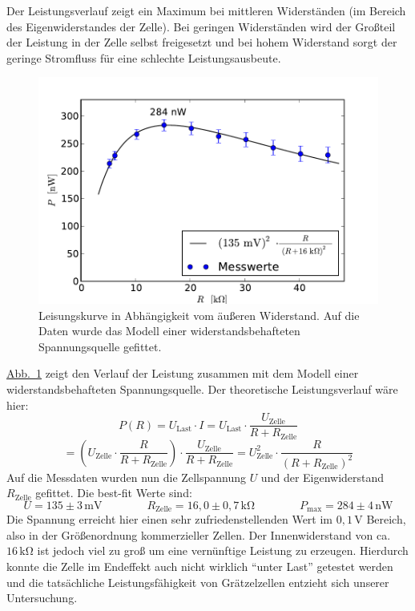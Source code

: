 \documentclass[11pt]{scrartcl}
\newcommand{\unit}[1]{\ensuremath{\,\mathrm{#1}}} %
\begin{document}
Der Leistungsverlauf zeigt ein Maximum bei mittleren Widerständen (im Bereich des Eigenwiderstandes der Zelle). Bei geringen Widerständen wird der Großteil der Leistung in der Zelle selbst freigesetzt und bei hohem Widerstand sorgt der geringe Stromfluss für eine schlechte Leistungsausbeute.
\begin{figure}[ht]
\begin{center}
\includegraphics[width=1.0\textwidth]{images/graetzel_leistung.pdf}
\end{center}
\vspace{-1.5\baselineskip}
\caption{Leisungskurve in Abhängigkeit vom äußeren Widerstand. Auf die Daten wurde das Modell einer widerstandsbehafteten Spannungsquelle gefittet.}
\label{leistungskurve}
\end{figure}
\hyperref[leistungskurve]{Abb.~\ref{leistungskurve}} zeigt den Verlauf der Leistung zusammen mit dem Modell einer widerstandsbehafteten Spannungsquelle. Der theoretische Leistungsverlauf wäre hier:
\[
P(R)= U_{\text{Last}}\cdot I
= U_{\text{Last}}\cdot \frac{U_{\text{Zelle}}}{R+R_{\text{Zelle}}}
\]
\[
= \left(U_{\text{Zelle}}\cdot \frac{R}{R+R_{\text{Zelle}}}\right)\cdot \frac{U_{\text{Zelle}}}{R+R_{\text{Zelle}}}
= U_{\text{Zelle}}^2\cdot \frac{R}{(R+R_{\text{Zelle}})^2}
\]
Auf die Messdaten wurden nun die Zellspannung $U$ und der Eigenwiderstand $R_{\text{Zelle}}$ gefittet. Die best-fit Werte sind:
\[
U = 135 \pm 3\unit{mV}
\qquad\qquad
R_{\text{Zelle}} = 16,0 \pm 0,7\unit{k\Omega}
\qquad\qquad
P_{\text{max}} = 284 \pm 4\unit{nW}
\]
Die Spannung erreicht hier einen sehr zufriedenstellenden Wert im $0,1\unit{V}$ Bereich, also in der Größenordnung kommerzieller Zellen. Der Innenwiderstand von ca. $16\unit{k\Omega}$ ist jedoch viel zu groß um eine vernünftige Leistung zu erzeugen. Hierdurch konnte die Zelle im Endeffekt auch nicht wirklich "`unter Last"' getestet werden und die tatsächliche Leistungsfähigkeit von Grätzelzellen entzieht sich unserer Untersuchung.
\end{document}
